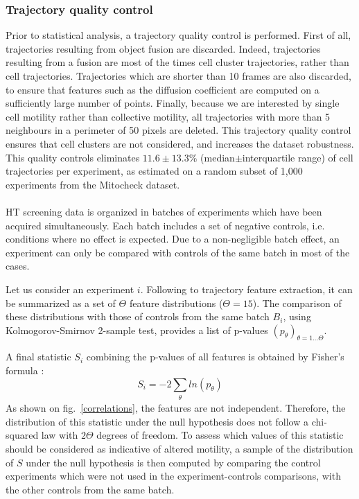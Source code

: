 \subsubsection{Trajectory quality control}
 Prior to statistical analysis, a trajectory quality control is performed. First of all, trajectories resulting from object fusion are discarded. Indeed, trajectories resulting from a fusion are most of the times cell cluster trajectories, rather than cell trajectories. Trajectories which are shorter than 10 frames are also discarded, to ensure that features such as the diffusion coefficient are computed on a sufficiently large number of points. Finally, because we are interested by single cell motility rather than collective motility, all trajectories with more than 5 neighbours in a perimeter of 50 pixels are deleted. This trajectory quality control ensures that cell clusters are not considered, and increases the dataset robustness. This quality controls eliminates $11.6\pm 13.3 \%$ (median$\pm$interquartile range) of cell trajectories per experiment, as estimated on a random subset of 1,000 experiments from the Mitocheck dataset.
\paragraph*{}
HT screening data is organized in batches of experiments which have
been acquired simultaneously. Each batch includes a set of negative
controls, i.e. conditions where no effect is expected. Due to a
non-negligible batch effect, an experiment can only be compared with
controls of the same batch in most of the cases. 

Let us consider an experiment $i$. Following to trajectory feature extraction, it can be summarized as a set of $\Theta$ feature distributions ($\Theta = 15$). The comparison of these distributions with those of controls from the same batch $B_i$, using Kolmogorov-Smirnov 2-sample test, provides a list of p-values $(p_\theta)_{\theta=1\ldots\Theta} $. 

A final statistic $S_{i}$ combining the p-values of all features is  obtained by Fisher's formula :
\begin{equation}\label{FisherFormula}
S_{i}=-2 \sum_{\substack{\theta}}ln(p_\theta)
\end{equation}
As shown on fig.~\ref{correlations}, the features are not independent. Therefore, the distribution of this statistic under the null hypothesis does not follow a chi-squared law with $2\Theta$ degrees of freedom. To assess which values of this statistic should be considered as indicative of altered motility, a sample of the distribution of $S$ under the null hypothesis is then computed by comparing the control experiments  which were not used in the experiment-controls comparisons, with the other controls from the same batch.

